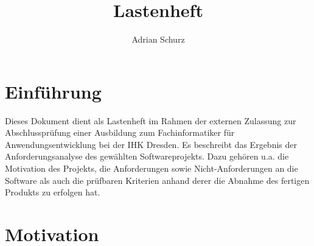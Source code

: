 \documentclass[11pt]{article}
\author{Adrian Schurz}
\title{Lastenheft}
\begin{document}
\maketitle
{}
\newpage
{}
\tableofcontents

\section{Einführung}
Dieses Dokument dient als Lastenheft im Rahmen der externen Zulassung  zur Abschlussprüfung einer Ausbildung zum Fachinformatiker für Anwendungsentwicklung bei der IHK Dresden. Es beschreibt das Ergebnis der Anforderungsanalyse des gewählten Softwareprojekts. Dazu gehören u.a. die Motivation des Projekts, die Anforderungen sowie Nicht-Anforderungen an die Software als auch die prüfbaren Kriterien anhand derer die Abnahme des fertigen Produkts zu erfolgen hat.

\section{Motivation}
\end{document}
